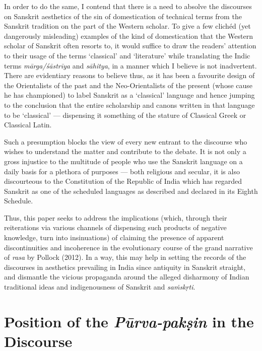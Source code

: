 In order to do the same, I contend that there is a need to absolve the discourses on Sanskrit aesthetics of the sin of domestication of technical terms from the Sanskrit tradition on the part of the Western scholar. To give a few clichéd (yet dangerously misleading) examples of the kind of domestication that the Western scholar of Sanskrit often resorts to, it would suffice to draw the readers’ attention to their usage of the terms ‘classical’ and ‘literature’ while translating the Indic terms \textsl{mārga/śāstrīya} and \textsl{sāhitya}, in a manner which I believe is not inadvertent. There are evidentiary reasons to believe thus, as it has been a favourite design of the Orientalists of the past and the Neo-Orientalists of the present (whose cause he has championed) to label Sanskrit as a ‘classical’ language and hence jumping to the conclusion that the entire scholarship and canons written in that language to be ‘classical’ --- dispensing it something of the stature of Classical Greek or Classical Latin. 

Such a presumption blocks the view of every new entrant to the discourse who wishes to understand the matter and contribute to the debate. It is not only a gross injustice to the multitude of people who use the Sanskrit language on a daily basis for a plethora of purposes --- both religious and secular, it is also discourteous to the Constitution of the Republic of India which has regarded Sanskrit as one of the scheduled languages as described and declared in its Eighth Schedule. 

Thus, this paper seeks to address the implications (which, through their reiterations via various channels of dispensing such products of negative knowledge, turn into insinuations) of claiming the presence of apparent discontinuities and incoherence in the evolutionary course of the grand narrative of \textsl{rasa} by Pollock (2012). In a way, this may help in setting the records of the discourses in aesthetics prevailing in India since antiquity in Sanskrit straight, and dismantle the vicious propaganda around the alleged disharmony of Indian traditional ideas and indigenousness of Sanskrit and \textsl{saṁskṛti}.\\[-21pt]

\section*{Position of the \textsl{Pūrva-pakṣin} in the Discourse}

